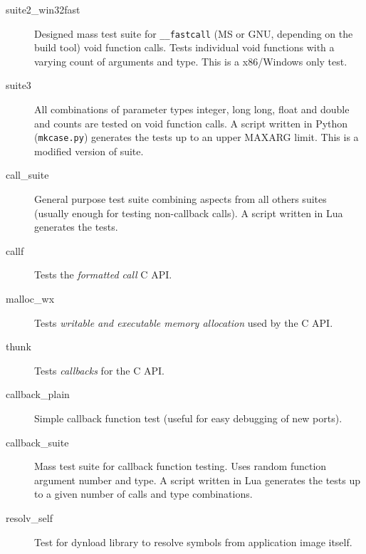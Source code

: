 \begin{description}
\item [suite2\_win32fast]
Designed mass test suite for {\tt \_\_fastcall} (MS or GNU, depending on the build tool) void function calls.
Tests individual void functions with a varying count of arguments and type.
This is a x86/Windows only test.

\item [suite3]
All combinations of parameter types integer, long long, float and double and
counts are tested on void function calls.
A script written in Python ({\tt mkcase.py}) generates the tests up to
an upper MAXARG limit.
This is a modified version of suite.

\item [call\_suite]
General purpose test suite combining aspects from all others suites (usually enough for
testing non-callback calls).
A script written in Lua generates the tests.

\item [callf]
Tests the \emph{formatted call}  C API.

\item [malloc\_wx]
Tests \emph{writable and executable memory allocation} used by the
 C API.

\item [thunk]
Tests \emph{callbacks} for the  C API.

\item [callback\_plain]
Simple callback function test (useful for easy debugging of new ports).

\item [callback\_suite]
Mass test suite for callback function testing. Uses random function argument
number and type.
A script written in Lua generates the tests up to a given number of calls and
type combinations.

\item [resolv\_self]
Test for dynload library to resolve symbols from application image itself.

\end{description}

